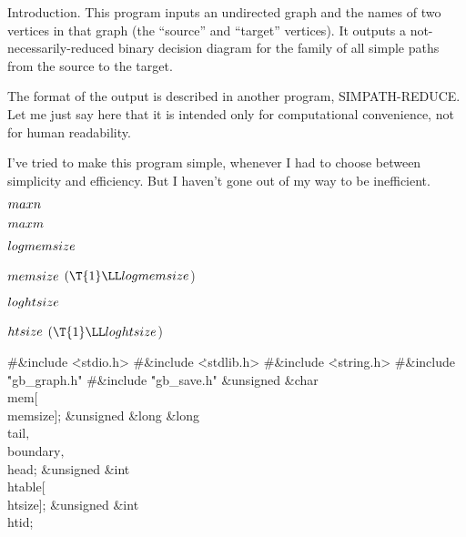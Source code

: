 
\datethis




Introduction. This program inputs an undirected graph and the names of
two
vertices in that graph (the ``source'' and ``target'' vertices).
It outputs a not-necessarily-reduced binary decision diagram
for the family of all simple paths from the source to the target.

The format of the output is described in another program,
{\mc SIMPATH-REDUCE}. Let me just say here that it is intended
only for computational convenience, not for human readability.

I've tried to make this program simple, whenever I had to
choose between simplicity and efficiency. But I haven't gone
out of my way to be inefficient.

\Y\B\4\D$\\{maxn}$ \5
\par
\B\4\D$\\{maxm}$ \5
\par
\B\4\D$\\{logmemsize}$ \5
\par
\B\4\D$\\{memsize}$ \5
$(\T{1}\LL\\{logmemsize}{}$)\par
\B\4\D$\\{loghtsize}$ \5
\par
\B\4\D$\\{htsize}$ \5
$(\T{1}\LL\\{loghtsize}{}$)\par
\Y\B\8\#\&{include} \.{<stdio.h>}\6
\8\#\&{include} \.{<stdlib.h>}\6
\8\#\&{include} \.{<string.h>}\6
\8\#\&{include} \.{"gb\_graph.h"}\6
\8\#\&{include} \.{"gb\_save.h"}\6
\&{unsigned} \&{char} \\{mem}[\\{memsize}];\6
\&{unsigned} \&{long} \&{long} \\{tail}${},{}$ \\{boundary}${},{}$ \\{head};\6
\&{unsigned} \&{int} \\{htable}[\\{htsize}];\6
\&{unsigned} \&{int} \\{htid};\6
